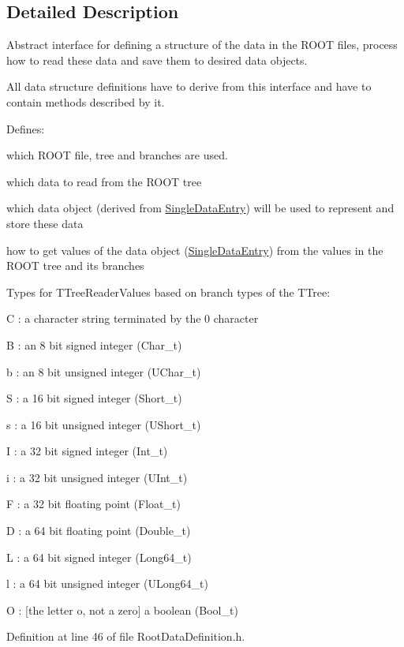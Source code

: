 \subsection{Detailed Description}
Abstract interface for defining a structure of the data in the R\+O\+O\+T files, process how to read these data and save them to desired data objects. 

All data structure definitions have to derive from this interface and have to contain methods described by it.

Defines\+:
\begin{DoxyItemize}
\item which R\+O\+O\+T file, tree and branches are used.
\item which data to read from the R\+O\+O\+T tree
\item which data object (derived from \hyperlink{classSingleDataEntry}{Single\+Data\+Entry}) will be used to represent and store these data
\item how to get values of the data object (\hyperlink{classSingleDataEntry}{Single\+Data\+Entry}) from the values in the R\+O\+O\+T tree and its branches
\end{DoxyItemize}

Types for T\+Tree\+Reader\+Values based on branch types of the T\+Tree\+:

C \+: a character string terminated by the 0 character

B \+: an 8 bit signed integer (Char\+\_\+t)

b \+: an 8 bit unsigned integer (U\+Char\+\_\+t)

S \+: a 16 bit signed integer (Short\+\_\+t)

s \+: a 16 bit unsigned integer (U\+Short\+\_\+t)

I \+: a 32 bit signed integer (Int\+\_\+t)

i \+: a 32 bit unsigned integer (U\+Int\+\_\+t)

F \+: a 32 bit floating point (Float\+\_\+t)

D \+: a 64 bit floating point (Double\+\_\+t)

L \+: a 64 bit signed integer (Long64\+\_\+t)

l \+: a 64 bit unsigned integer (U\+Long64\+\_\+t)

O \+: \mbox{[}the letter o, not a zero\mbox{]} a boolean (Bool\+\_\+t) 

Definition at line 46 of file Root\+Data\+Definition.\+h.



